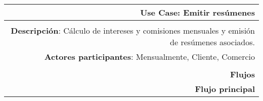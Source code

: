 \begin{tabularx}{\textwidth}{| r | X |}
\hline
\multicolumn{2}{|X|}{
\textbf{Use Case}: Emitir resúmenes} \\

\hline
\multicolumn{2}{|c|}{\cellcolor[gray]{0.6}} \\

\hline
\multicolumn{2}{|X|}{
\textbf{Descripción}: Cálculo de intereses y comisiones mensuales y emisión de
resúmenes asociados.} \\

\hline
\multicolumn{2}{|X|}{
\textbf{Actores participantes}: Mensualmente, Cliente, Comercio} \\

\hline
\multicolumn{2}{|c|}{\cellcolor[gray]{0.6} } \\

\hline
\multicolumn{2}{|X|}{
\textbf{Flujos}} \\

\hline
\multicolumn{2}{|X|}{
\textbf{Flujo principal}} \\


\end{tabularx}
